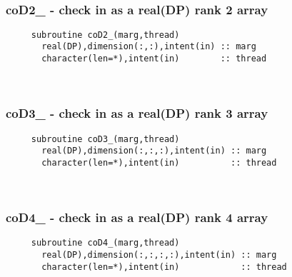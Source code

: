  
\mbox{}\hrulefill\ 

  \subsubsection{coD2\_ - check in as a real(DP) rank 2 array}

\begin{verbatim} 
     subroutine coD2_(marg,thread)
       real(DP),dimension(:,:),intent(in) :: marg
       character(len=*),intent(in)        :: thread
 \end{verbatim}%
 
 
\mbox{}\hrulefill\ 
 
  \subsubsection{coD3\_ - check in as a real(DP) rank 3 array}

\begin{verbatim} 
     subroutine coD3_(marg,thread)
       real(DP),dimension(:,:,:),intent(in) :: marg
       character(len=*),intent(in)          :: thread
 \end{verbatim}%
 
 
\mbox{}\hrulefill\ 
 
  \subsubsection{coD4\_ - check in as a real(DP) rank 4 array}

\begin{verbatim} 
     subroutine coD4_(marg,thread)
       real(DP),dimension(:,:,:,:),intent(in) :: marg
       character(len=*),intent(in)            :: thread
 \end{verbatim}%
 
